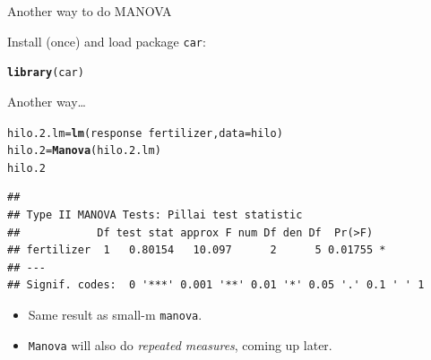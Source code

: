 \documentclass[unknownkeysallowed]{beamer}\usepackage[]{graphicx}\usepackage[]{color}
\makeatletter
\newcommand{\hlopt}[1]{\textcolor[rgb]{0,0,0}{#1}}%
\newcommand{\hlstd}[1]{\textcolor[rgb]{0.345,0.345,0.345}{#1}}%
\newcommand{\hlkwb}[1]{\textcolor[rgb]{0.69,0.353,0.396}{#1}}%
\newcommand{\hlkwc}[1]{\textcolor[rgb]{0.333,0.667,0.333}{#1}}%
\newcommand{\hlkwd}[1]{\textcolor[rgb]{0.737,0.353,0.396}{\textbf{#1}}}%
\newenvironment{kframe}{%
 \def\at@end@of@kframe{}%
 \ifinner\ifhmode%
  \def\at@end@of@kframe{\end{minipage}}%
  \begin{minipage}{\columnwidth}%
 \fi\fi%
 \def\FrameCommand##1{\hskip\@totalleftmargin \hskip-\fboxsep
 \colorbox{shadecolor}{##1}\hskip-\fboxsep
     \hskip-\linewidth \hskip-\@totalleftmargin \hskip\columnwidth}%
 \MakeFramed {\advance\hsize-\width
   \@totalleftmargin\z@ \linewidth\hsize
   \@setminipage}}%
 {\par\unskip\endMakeFramed%
 \at@end@of@kframe}
\newenvironment{knitrout}{}{} %
\makeatother
\begin{document}
\begin{frame}[fragile]{Another way to do MANOVA}

  
Install (once) and load package \texttt{car}:
  
\begin{knitrout}
\color{fgcolor}\begin{kframe}
\begin{alltt}
\hlkwd{library}\hlstd{(car)}
\end{alltt}
\end{kframe}
\end{knitrout}


  
  
\end{frame}

\begin{frame}[fragile]{Another way\ldots}

\begin{knitrout}\footnotesize
{}\color{fgcolor}\begin{kframe}
\begin{alltt}
\hlstd{hilo.2.lm}\hlkwb{=}\hlkwd{lm}\hlstd{(response}\hlopt{~}\hlstd{fertilizer,}\hlkwc{data}\hlstd{=hilo)}
\hlstd{hilo.2}\hlkwb{=}\hlkwd{Manova}\hlstd{(hilo.2.lm)}
\hlstd{hilo.2}
\end{alltt}
\begin{verbatim}
## 
## Type II MANOVA Tests: Pillai test statistic
##            Df test stat approx F num Df den Df  Pr(>F)  
## fertilizer  1   0.80154   10.097      2      5 0.01755 *
## ---
## Signif. codes:  0 '***' 0.001 '**' 0.01 '*' 0.05 '.' 0.1 ' ' 1
\end{verbatim}
\end{kframe}
\end{knitrout}

    \begin{itemize}
\item Same result as small-m \texttt{manova}.
\item \texttt{Manova} will also do \emph{repeated measures}, coming up
  later.
  \end{itemize}

\end{frame}
\end{document}
